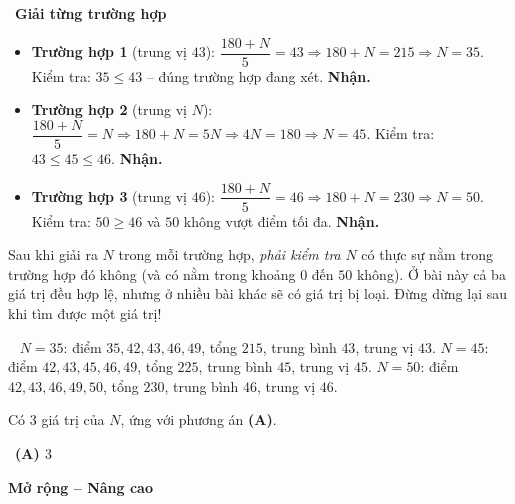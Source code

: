 \documentclass[11pt]{article}
\providecommand{\AnsWord}{Đáp số}
\newcommand{\ans}[1]{\par\smallskip{\bfseries\color{tmGreen!88!black}\AnsWord:}\ {\bfseries\color{AnsRed}#1}\par}
\newcommand{\dividerbar}[1]{\par\vspace{0.6em}\noindent
  \begin{tcolorbox}[enhanced,frame hidden,interior hidden,borderline west={5pt}{0pt}{ProbBlue},
    colback=white,left=12pt,right=12pt,top=5pt,bottom=5pt,arc=4pt]
  {\large\bfseries\color{ProbBlue} #1}\end{tcolorbox}\vspace{0.4em}}
\newcommand{\step}[2]{\par\smallskip\noindent{\bfseries\color{tmBlue!85!black}\StepWord~#1.}\ {\bfseries #2}\par\nopagebreak}
\newcommand{\verify}[1]{\par\smallskip\noindent{\bfseries\color{tmGreen!80!black}\faCheckCircle\ \CheckWord}\ #1\par}
\def\AnsWord{Đáp số}
\def\StepWord{Bước}
\def\CheckWord{Thử lại:}
\begin{document}
{\step{3}{Giải từng trường hợp}
\begin{itemize}[leftmargin=1.4em,itemsep=1pt]
\item \textbf{Trường hợp 1} (trung vị $43$): $\dfrac{180+N}{5}=43\Rightarrow 180+N=215\Rightarrow N=35$. Kiểm tra: $35\le 43$ -- đúng trường hợp đang xét. \textbf{Nhận.}
\item \textbf{Trường hợp 2} (trung vị $N$): $\dfrac{180+N}{5}=N\Rightarrow 180+N=5N\Rightarrow 4N=180\Rightarrow N=45$. Kiểm tra: $43\le 45\le 46$. \textbf{Nhận.}
\item \textbf{Trường hợp 3} (trung vị $46$): $\dfrac{180+N}{5}=46\Rightarrow 180+N=230\Rightarrow N=50$. Kiểm tra: $50\ge 46$ và $50$ không vượt điểm tối đa. \textbf{Nhận.}
\end{itemize}

\begin{warnbox}Sau khi giải ra $N$ trong mỗi trường hợp, \emph{phải kiểm tra} $N$ có thực sự nằm trong trường hợp đó không (và có nằm trong khoảng $0$ đến $50$ không). Ở bài này cả ba giá trị đều hợp lệ, nhưng ở nhiều bài khác sẽ có giá trị bị loại. Đừng dừng lại sau khi tìm được một giá trị!\end{warnbox}

\verify{
$N=35$: điểm $35,42,43,46,49$, tổng $215$, trung bình $43$, trung vị $43$.
$N=45$: điểm $42,43,45,46,49$, tổng $225$, trung bình $45$, trung vị $45$.
$N=50$: điểm $42,43,46,49,50$, tổng $230$, trung bình $46$, trung vị $46$.}
Có $3$ giá trị của $N$, ứng với phương án \textbf{(A)}.
\ans{(A) $3$}
}

\clearpage
\dividerbar{Mở rộng -- Nâng cao}
\end{document}
